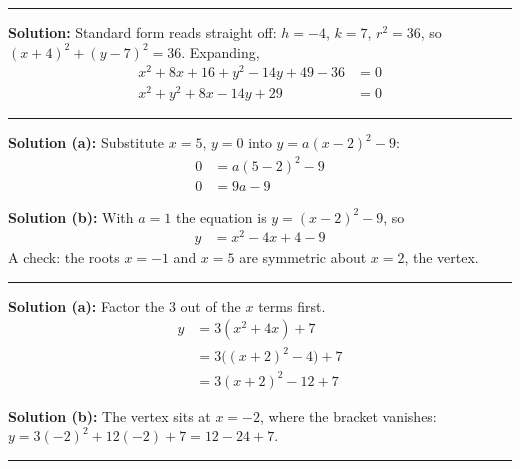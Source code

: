 \documentclass[12pt]{article}
\begin{document}
\vspace{0.2cm}\noindent\rule{\linewidth}{0.2pt}


\textbf{Solution:} Standard form reads straight off: $h = -4$, $k = 7$, $r^2 = 36$, so
$(x + 4)^2 + (y - 7)^2 = 36$. Expanding,
\begin{align*}
  x^2 + 8x + 16 + y^2 - 14y + 49 - 36 &= 0 \\
  x^2 + y^2 + 8x - 14y + 29 &= 0
\end{align*}

\vspace{0.2cm}\noindent\rule{\linewidth}{0.2pt}


\textbf{Solution (a):} Substitute $x = 5$, $y = 0$ into $y = a(x-2)^2 - 9$:
\begin{align*}
  0 &= a(5 - 2)^2 - 9 \\
  0 &= 9a - 9
\end{align*}

\textbf{Solution (b):} With $a = 1$ the equation is $y = (x-2)^2 - 9$, so
\begin{align*}
  y &= x^2 - 4x + 4 - 9
\end{align*}
A check: the roots $x = -1$ and $x = 5$ are symmetric about $x = 2$, the vertex.

\vspace{0.2cm}\noindent\rule{\linewidth}{0.2pt}


\textbf{Solution (a):} Factor the $3$ out of the $x$ terms first.
\begin{align*}
  y &= 3(x^2 + 4x) + 7 \\
    &= 3\bigl((x + 2)^2 - 4\bigr) + 7 \\
    &= 3(x + 2)^2 - 12 + 7
\end{align*}

\textbf{Solution (b):} The vertex sits at $x = -2$, where the bracket vanishes:
$y = 3(-2)^2 + 12(-2) + 7 = 12 - 24 + 7$. 

\vspace{0.2cm}\noindent\rule{\linewidth}{0.2pt}

\end{document}
